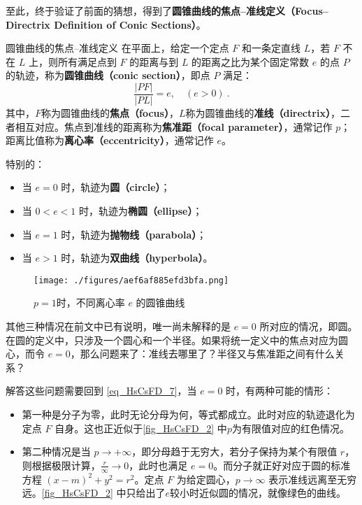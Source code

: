 至此，终于验证了前面的猜想，得到了\textbf{圆锥曲线的焦点–准线定义（Focus–Directrix Definition of Conic Sections）}。

\begin{definition}{圆锥曲线的焦点–准线定义}\label{def_HsCsFD_1}
在平面上，给定一个定点 $F$ 和一条定直线 $L$，若 $F$ 不在 $L$ 上，则所有满足点到 $F$ 的距离与到 $L$ 的距离之比为某个固定常数 $e$ 的点 $P$ 的轨迹，称为\textbf{圆锥曲线（conic section）}，即点 $P$ 满足：
\begin{equation}
\frac{|PF|}{|PL|} = e,\quad(e>0)~.
\end{equation}
其中，$F$称为圆锥曲线的\textbf{焦点（focus）}，$L$称为圆锥曲线的\textbf{准线（directrix）}，二者相互对应。焦点到准线的距离称为\textbf{焦准距（focal parameter）}，通常记作 $p$；距离比值称为\textbf{离心率（eccentricity）}，通常记作 $e$。

特别的：
\begin{itemize}
\item 当 $e = 0$ 时，轨迹为\textbf{圆（circle）}；
\item 当 $0 < e < 1$ 时，轨迹为\textbf{椭圆（ellipse）}；
\item 当 $e = 1$ 时，轨迹为\textbf{抛物线（parabola）}；
\item 当 $e > 1$ 时，轨迹为\textbf{双曲线（hyperbola）}。
\end{itemize}
\end{definition}

\begin{figure}[ht]
\centering
\texttt{[image: ./figures/aef6af885efd3bfa.png]}
\caption{$p = 1$时，不同离心率 $e$ 的圆锥曲线} \label{fig_HsCsFD_2}
\end{figure}
其他三种情况在前文中已有说明，唯一尚未解释的是 $e = 0$ 所对应的情况，即圆。在圆的定义中，只涉及一个圆心和一个半径。如果将统一定义中的焦点对应为圆心，而令 $e = 0$，那么问题来了：准线去哪里了？半径又与焦准距之间有什么关系？

解答这些问题需要回到 \autoref{eq_HsCsFD_7}，当 $e = 0$ 时，有两种可能的情形：
\begin{itemize}
\item 第一种是分子为零，此时无论分母为何，等式都成立。此时对应的轨迹退化为定点 $F$ 自身。这也正近似于\autoref{fig_HsCsFD_2} 中$p$为有限值对应的红色情况。
\item 第二种情况是当 $p \to +\infty$，即分母趋于无穷大，若分子保持为某个有限值 $r$，则根据极限计算，$\displaystyle\frac{r}{\infty} \to 0$，此时也满足 $e = 0$。而分子就正好对应于圆的标准方程 $(x - m)^2 + y^2 = r^2$。定点 $F$ 为给定圆心，$p \to \infty$ 表示准线远离至无穷远。\autoref{fig_HsCsFD_2} 中只给出了$e$较小时近似圆的情况，就像绿色的曲线。
\end{itemize}

